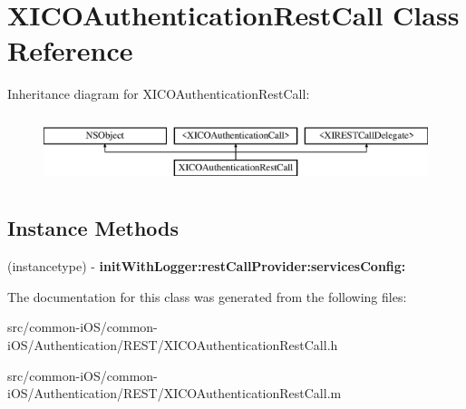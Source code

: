 \hypertarget{interface_x_i_c_o_authentication_rest_call}{}\section{X\+I\+C\+O\+Authentication\+Rest\+Call Class Reference}
\label{interface_x_i_c_o_authentication_rest_call}
Inheritance diagram for X\+I\+C\+O\+Authentication\+Rest\+Call\+:\begin{figure}[H]
\begin{center}
\leavevmode
\includegraphics[height=2.000000cm]{interface_x_i_c_o_authentication_rest_call}
\end{center}
\end{figure}
\subsection*{Instance Methods}
\begin{DoxyCompactItemize}
\item 
\hypertarget{interface_x_i_c_o_authentication_rest_call_ab6b9846756297041479f60a403874d38}{}\label{interface_x_i_c_o_authentication_rest_call_ab6b9846756297041479f60a403874d38} 
(instancetype) -\/ {\bfseries init\+With\+Logger\+:rest\+Call\+Provider\+:services\+Config\+:}
\end{DoxyCompactItemize}


The documentation for this class was generated from the following files\+:\begin{DoxyCompactItemize}
\item 
src/common-\/i\+O\+S/common-\/i\+O\+S/\+Authentication/\+R\+E\+S\+T/X\+I\+C\+O\+Authentication\+Rest\+Call.\+h\item 
src/common-\/i\+O\+S/common-\/i\+O\+S/\+Authentication/\+R\+E\+S\+T/X\+I\+C\+O\+Authentication\+Rest\+Call.\+m\end{DoxyCompactItemize}
